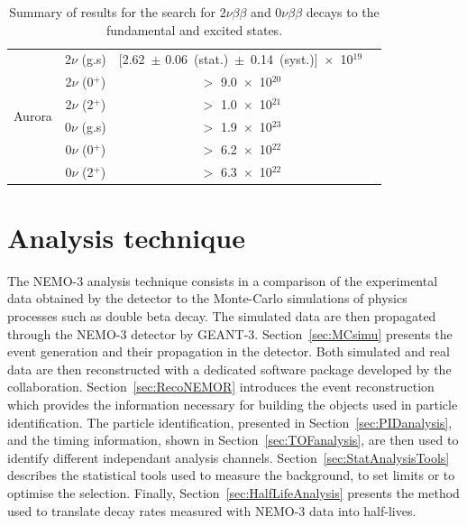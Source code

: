 \documentclass[main.tex]{subfiles}
\begin{document}
\begin{table}[h!]
\begin{center}
\begin{tabular}{c|c|c|c}
\hline

\multirow{6}{*}{Aurora} & 2$\nu$ (g.s) & [2.62~$\pm$ 0.06~(stat.)~$\pm$~0.14~(syst.)]~$\times$~10$^{\text{19}}$& \multirow{6}{*}{\cite{Aurora}}\\[0.1cm]
                        & 2$\nu$ (0$^+$) & $>$ 9.0~$\times$~10$^{\text{20}}$&\\[0.1cm]
                        & 2$\nu$ (2$^+$) & $>$ 1.0~$\times$~10$^{\text{21}}$&\\[0.1cm]
                        & 0$\nu$ (g.s)   & $>$ 1.9~$\times$~10$^{\text{23}}$&\\[0.1cm]
                        & 0$\nu$ (0$^+$) & $>$ 6.2~$\times$~10$^{\text{22}}$&\\[0.1cm]
                        & 0$\nu$ (2$^+$) & $>$ 6.3~$\times$~10$^{\text{22}}$&\\[0.1cm]
\bottomrule
\end{tabular}
\caption{Summary of results for the search for 2$\nu\beta\beta$ and 0$\nu\beta\beta$ decays to the fundamental and excited states.}
\label{TableSummaryResultsFS}
\end{center}
\end{table}


\FloatBarrier

\clearpage

\section{Analysis technique}\label{sec:AnalysisTechnique}


\NI The NEMO-3 analysis technique consists in a comparison of the experimental data obtained by the detector to the Monte-Carlo simulations of physics processes such as double beta decay. The simulated data are then propagated through the NEMO-3 detector by GEANT-3. Section~\ref{sec:MCsimu} presents the event generation and their propagation in the detector. Both simulated and real data are then reconstructed with a dedicated software package developed by the collaboration. Section~\ref{sec:RecoNEMOR} introduces the event reconstruction which provides the information necessary for building the objects used in particle identification. The particle identification, presented in Section~\ref{sec:PIDanalysis}, and the timing information, shown in Section~\ref{sec:TOFanalysis}, are then used to identify different independant analysis channels. Section~\ref{sec:StatAnalysisTools} describes the statistical tools used to measure the background, to set limits or to optimise the selection. Finally, Section~\ref{sec:HalfLifeAnalysis} presents the method used to translate decay rates measured with NEMO-3 data into half-lives.
\end{document}

